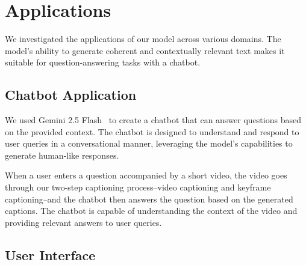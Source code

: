 \section{Applications}

We investigated the applications of our model across various domains. The model's ability to generate coherent and contextually relevant text makes it suitable for question-answering tasks with a chatbot.



\subsection{Chatbot Application}

We used Gemini 2.5 Flash~\cite{comanici2025gemini} to create a chatbot that can answer questions based on the provided context. The chatbot is designed to understand and respond to user queries in a conversational manner, leveraging the model's capabilities to generate human-like responses.

When a user enters a question accompanied by a short video, the video goes through our two-step captioning process--video captioning and keyframe captioning--and the chatbot then answers the question based on the generated captions. The chatbot is capable of understanding the context of the video and providing relevant answers to user queries.

\subsection{User Interface}

